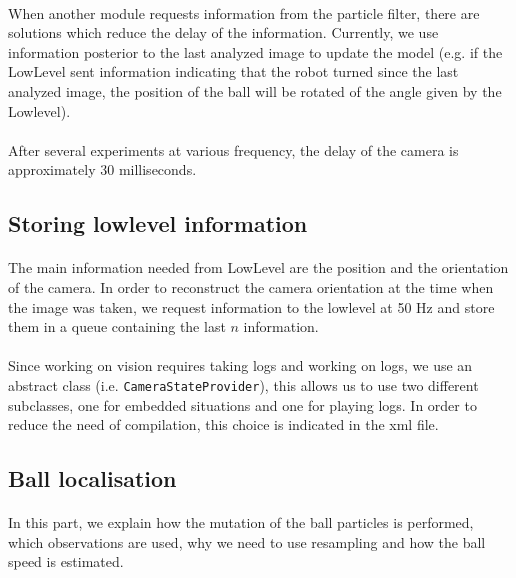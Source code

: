 \documentclass[a4paper,12pt]{article}
\begin{document}
\paragraph{}
When another module requests information from the particle filter, there are
solutions which reduce the delay of the information. Currently, we
use information posterior to the last analyzed image to update the model
(e.g. if the LowLevel sent information indicating that the robot turned since
the last analyzed image, the position of the ball will be rotated of the angle
given by the Lowlevel).
\paragraph{}
After several experiments at various frequency, the delay of the camera is
approximately 30 milliseconds.

\subsection{Storing lowlevel information}
\paragraph{}
The main information needed from LowLevel are the position and the orientation
of the camera. In order to reconstruct the camera orientation at the time
when the image was taken, we request information to the lowlevel at 50 Hz and
store them in a queue containing the last $n$ information.
\paragraph{}
Since working on vision requires taking logs and working on logs, we use an
abstract class (i.e. \verb!CameraStateProvider!), this allows us to use two
different subclasses, one for embedded situations and one for playing logs. In
order to reduce the need of compilation, this choice is indicated in the xml
file.

\subsection{Ball localisation}
\paragraph{}
In this part, we explain how the mutation of the ball particles is performed,
which observations are used, why we need to use resampling and how the ball
speed is estimated.
\end{document}
